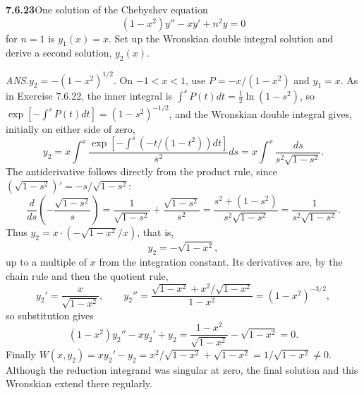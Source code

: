 \par\bigskip
\noindent\textbf{7.6.23}\quad One solution of the Chebyshev equation
\[
(1-x^{2})y''-xy'+n^{2}y=0
\]
for $n=1$ is $y_{1}(x)=x$. Set up the Wronskian double integral solution and
derive a second solution, $y_{2}(x)$.
\par\nobreak\hfill\emph{ANS.}\enspace $y_{2}=-(1-x^{2})^{1/2}$.
\solution
On $-1<x<1$, use $P=-x/(1-x^2)$ and $y_1=x$. As in Exercise 7.6.22,
the inner integral is $\int^sP(t)dt=\frac12\ln(1-s^2)$, so
$\exp[-\int^sP(t)dt]=(1-s^2)^{-1/2}$, and the
Wronskian double integral gives, initially on either side of zero,
\[
y_2=x\int^x\frac{\exp[-\int^s(-t/(1-t^2))dt]}{s^2}ds
=x\int^x\frac{ds}{s^2\sqrt{1-s^2}}.
\]
The antiderivative follows directly from the product rule, since
$(\sqrt{1-s^2})'=-s/\sqrt{1-s^2}$:
\[
\frac d{ds}\left(-\frac{\sqrt{1-s^2}}s\right)
=\frac1{\sqrt{1-s^2}}+\frac{\sqrt{1-s^2}}{s^2}
=\frac{s^2+(1-s^2)}{s^2\sqrt{1-s^2}}
=\frac1{s^2\sqrt{1-s^2}}.
\]
Thus $y_2=x\cdot(-\sqrt{1-x^2}/x)$, that is,
\[
\boxed{y_2=-\sqrt{1-x^2}},
\]
up to a multiple of $x$ from the integration constant. Its derivatives
are, by the chain rule and then the quotient rule,
\[
y_2'=\frac x{\sqrt{1-x^2}},\qquad
y_2''=\frac{\sqrt{1-x^2}+x^2/\sqrt{1-x^2}}{1-x^2}=(1-x^2)^{-3/2},
\]
so substitution gives
\[
(1-x^2)y_2''-xy_2'+y_2
=\frac{1-x^2}{\sqrt{1-x^2}}-\sqrt{1-x^2}=0.
\]
Finally $W(x,y_2)=xy_2'-y_2=x^2/\sqrt{1-x^2}+\sqrt{1-x^2}
=1/\sqrt{1-x^2}\ne0$. Although the reduction
integrand was singular at zero, the final solution and this Wronskian
extend there regularly.

